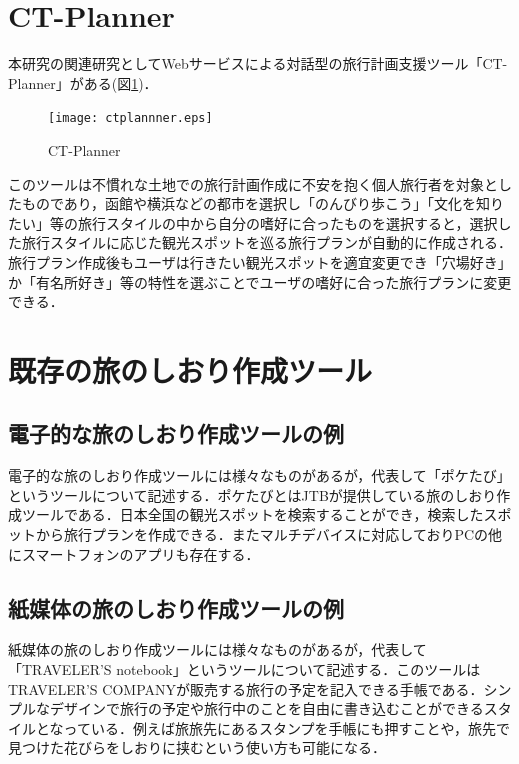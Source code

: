 \documentclass{funthesis}
\begin{document}
\section{CT-Planner}

本研究の関連研究としてWebサービスによる対話型の旅行計画支援ツール「CT-Planner」\cite{CTPlanner}がある(図\ref{LCT})．

\begin{figure}[htpb]
\begin{center}
\texttt{[image: ctplannner.eps]}
\end{center}
\caption{CT-Planner}
\label{LCT}
\end{figure}

このツールは不慣れな土地での旅行計画作成に不安を抱く個人旅行者を対象としたものであり，函館や横浜などの都市を選択し「のんびり歩こう」「文化を知りたい」等の旅行スタイルの中から自分の嗜好に合ったものを選択すると，選択した旅行スタイルに応じた観光スポットを巡る旅行プランが自動的に作成される．旅行プラン作成後もユーザは行きたい観光スポットを適宜変更でき「穴場好き」か「有名所好き」等の特性を選ぶことでユーザの嗜好に合った旅行プランに変更できる．


\section{既存の旅のしおり作成ツール}

\subsection{電子的な旅のしおり作成ツールの例}
電子的な旅のしおり作成ツールには様々なものがあるが，代表して「ポケたび」\cite{poketrip}というツールについて記述する．ポケたびとはJTBが提供している旅のしおり作成ツールである．日本全国の観光スポットを検索することができ，検索したスポットから旅行プランを作成できる．またマルチデバイスに対応しておりPCの他にスマートフォンのアプリも存在する．

\subsection{紙媒体の旅のしおり作成ツールの例}
紙媒体の旅のしおり作成ツールには様々なものがあるが，代表して「TRAVELER'S notebook」\cite{traver}というツールについて記述する．このツールはTRAVELER'S COMPANYが販売する旅行の予定を記入できる手帳である．シンプルなデザインで旅行の予定や旅行中のことを自由に書き込むことができるスタイルとなっている．例えば旅旅先にあるスタンプを手帳にも押すことや，旅先で見つけた花びらをしおりに挟むという使い方も可能になる．
\end{document}
